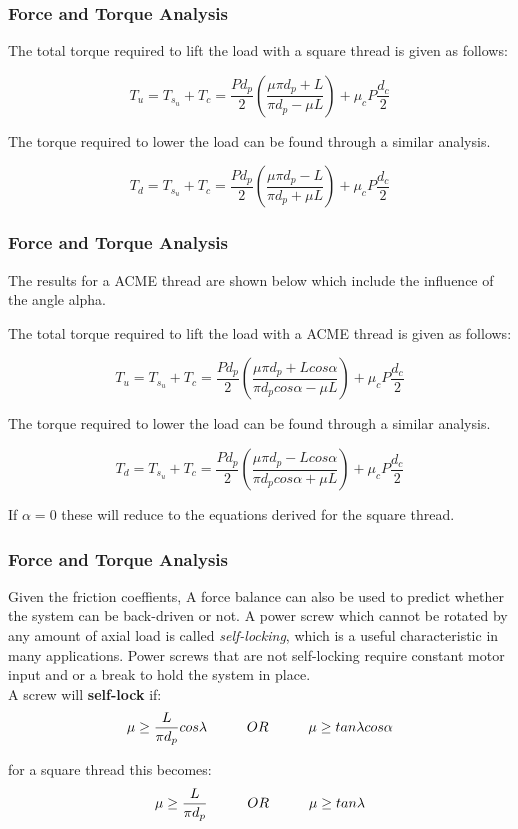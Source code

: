 \documentclass[fleqn]{beamer} %
\newcommand{\sectiontitleIII}{Force and Torque Analysis}
\begin{document}
	\begin{frame}[label=sectionIII] \footnotesize
		\frametitle{\sectiontitleIII}

		The total torque required to lift the load with a square thread is given as follows:

		\[T_u = T_{s_u}+T_c = \frac{Pd_p}{2}\left(\frac{\mu \pi d_p +L}{\pi d_p -\mu L}\right) + \mu_c P \frac{d_c}{2} \]

		The torque required to lower the load can be found through a similar analysis.

		\[T_d = T_{s_u}+T_c = \frac{Pd_p}{2}\left(\frac{\mu \pi d_p -L}{\pi d_p +\mu L}\right) + \mu_c P \frac{d_c}{2} \]

	\end{frame}


	\begin{frame}[label=sectionIII] \footnotesize
		\frametitle{\sectiontitleIII}

		The results for a ACME thread are shown below which include the influence of the angle alpha.

		The total torque required to lift the load with a ACME thread is given as follows:

		\[T_u = T_{s_u}+T_c = \frac{Pd_p}{2}\left(\frac{\mu \pi d_p +L cos \alpha }{\pi d_p cos \alpha-\mu L}\right) + \mu_c P \frac{d_c}{2} \]

		The torque required to lower the load can be found through a similar analysis.

		\[T_d = T_{s_u}+T_c = \frac{Pd_p}{2}\left(\frac{\mu \pi d_p -Lcos \alpha}{\pi d_p cos \alpha +\mu L}\right) + \mu_c P \frac{d_c}{2} \]

		If $\alpha=0$ these will reduce to the equations derived for the square thread.

	\end{frame}


	\begin{frame}[label=sectionIII] \footnotesize
		\frametitle{\sectiontitleIII}

		Given the friction coeffients, A force balance can also be used to predict whether the system can be back-driven or not. A power screw which cannot be rotated by any amount of axial load is called {\it self-locking}, which is a useful characteristic in many applications. Power screws that are not self-locking require constant motor input and or a break to hold the system in place. \vspace{5mm}\\

		A screw will {\bf self-lock} if: \[ \mu \geq \frac{L}{\pi d_p}cos\lambda  \hspace{10mm}OR\hspace{10mm}  \mu \geq tan\lambda cos\alpha \]

		for a square thread this becomes: \[\mu \geq \frac{L}{\pi d_p} \hspace{10mm}OR\hspace{10mm} \mu \geq tan\lambda\]


	\end{frame}	
	
\end{document}
